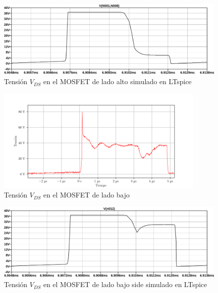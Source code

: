 \begin{figure}[H]
    \centering
    \includegraphics[width=\textwidth]{images/sim/16.pdf}
    \caption{Tensión $V_{DS}$ en el MOSFET de lado alto simulado en LTspice}
    \label{fig:vds_simulation_high}
\end{figure}

\begin{figure}[H]
    \centering
    \includegraphics[width=0.9\textwidth]{images/capturas-osciloscopio/17-11-2022/36.png}
    \caption{Tensión $V_{DS}$ en el MOSFET de lado bajo}
    \label{fig:vds_low}
\end{figure}

\begin{figure}[H]
    \centering
    \includegraphics[width=\textwidth]{images/sim/18.pdf}
    \caption{Tensión $V_{DS}$ en el MOSFET de lado bajo side simulado en LTspice}
    \label{fig:vds_simulation_low}
\end{figure}


